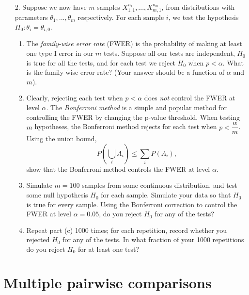 \documentclass[11pt]{article}
\begin{document}
\begin{enumerate}
\item[2.] Suppose we now have $m$ samples $X_{1,1}^{n_1}, ..., X_{m,1}^{n_m}$, from distributions with parameters $\theta_1,...,\theta_m$ respectively. For each sample $i$, we test the hypothesis $H_0: \theta_i = \theta_{i,0}$. 

\begin{enumerate}
\item The \textit{family-wise error rate} (FWER) is the probability of making at least one type I error in our $m$ tests. Suppose all our tests are independent, $H_0$ is true for all the tests, and for each test we reject $H_0$ when $p < \alpha$. What is the family-wise error rate? (Your answer should be a function of $\alpha$ and $m$).

\item Clearly, rejecting each test when $p < \alpha$ does \textit{not} control the FWER at level $\alpha$. The \textit{Bonferroni method} is a simple and popular method for controlling the FWER by changing the p-value threshold. When testing $m$ hypotheses, the Bonferroni method rejects for each test when $p < \dfrac{\alpha}{m}$.\\

Using the union bound,
$$P \left( \bigcup_i A_i \right) \leq \sum \limits_i P(A_i),$$
show that the Bonferroni method controls the FWER at level $\alpha$.

\item Simulate $m = 100$ samples from some continuous distribution, and test some null hypothesis $H_0$ for each sample. Simulate your data so that $H_0$ is true for every sample. Using the Bonferroni correction to control the FWER at level $\alpha = 0.05$, do you reject $H_0$ for any of the tests?

\item Repeat part (c) 1000 times; for each repetition, record whether you rejected $H_0$ for any of the tests. In what fraction of your 1000 repetitions do you reject $H_0$ for at least one test?
\end{enumerate}
\end{enumerate}

\section*{Multiple pairwise comparisons}
\end{document}
